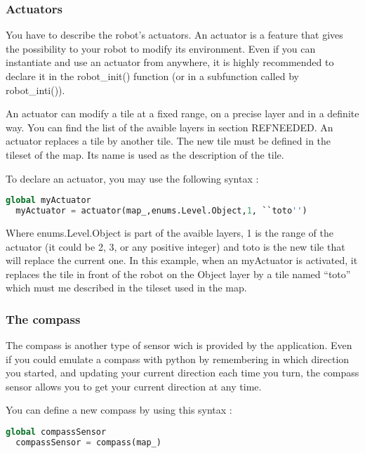 \documentclass[a4paper,11pt]{article}
\begin{document}
\subsubsection{Actuators}

You have to describe the robot's actuators. An actuator is a feature
that gives the possibility to your robot to modify its
environment. Even if you can instantiate and use an actuator from
anywhere, it is highly recommended to declare it in the robot\_init()
function (or in a subfunction called by robot\_inti()).

An actuator can modify a tile at a fixed range, on a precise layer and
in a definite way. You can find the list of the avaible layers in
section REFNEEDED. An actuator replaces a tile by another tile. The
new tile must be defined in the tileset of the map. Its name is used
as the description of the tile.

To declare an actuator, you may use the following syntax :

\begin{lstlisting}[language=Python]
  global myActuator
  myActuator = actuator(map_,enums.Level.Object,1, ``toto'')
\end{lstlisting}

Where enums.Level.Object is part of the avaible layers, 1 is the range
of the actuator (it could be 2, 3, or any positive integer) and toto
is the new tile that will replace the current one. In this example,
when an myActuator is activated, it replaces the tile in front of the
robot on the Object layer by a tile named ``toto'' which must me
described in the tileset used in the map.


\subsubsection{The compass}

The compass is another type of sensor wich is provided by the
application. Even if you could emulate a compass with python by
remembering in which direction you started, and updating your current
direction each time you turn, the compass sensor allows you to get
your current direction at any time.

You can define a new compass by using this syntax :

\begin{lstlisting}[language=Python]
  global compassSensor
  compassSensor = compass(map_)
\end{lstlisting}
\end{document}
